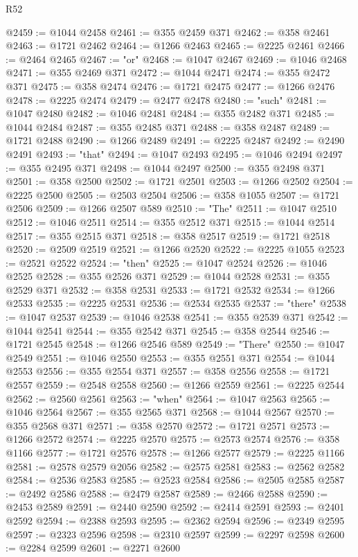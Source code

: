 \begin{lexlean}{R52}
\begin{coremodule}
@2459 := @1044 @2458
@2461 := @355 @2459 @371
@2462 := @358 @2461
@2463 := @1721 @2462
@2464 := @1266 @2463
@2465 := @2225 @2461
@2466 := @2464 @2465
@2467 := "or"
@2468 := @1047 @2467
@2469 := @1046 @2468
@2471 := @355 @2469 @371
@2472 := @1044 @2471
@2474 := @355 @2472 @371
@2475 := @358 @2474
@2476 := @1721 @2475
@2477 := @1266 @2476
@2478 := @2225 @2474
@2479 := @2477 @2478
@2480 := "such"
@2481 := @1047 @2480
@2482 := @1046 @2481
@2484 := @355 @2482 @371
@2485 := @1044 @2484
@2487 := @355 @2485 @371
@2488 := @358 @2487
@2489 := @1721 @2488
@2490 := @1266 @2489
@2491 := @2225 @2487
@2492 := @2490 @2491
@2493 := "that"
@2494 := @1047 @2493
@2495 := @1046 @2494
@2497 := @355 @2495 @371
@2498 := @1044 @2497
@2500 := @355 @2498 @371
@2501 := @358 @2500
@2502 := @1721 @2501
@2503 := @1266 @2502
@2504 := @2225 @2500
@2505 := @2503 @2504
@2506 := @358 @1055
@2507 := @1721 @2506
@2509 := @1266 @2507 @589
@2510 := "The"
@2511 := @1047 @2510
@2512 := @1046 @2511
@2514 := @355 @2512 @371
@2515 := @1044 @2514
@2517 := @355 @2515 @371
@2518 := @358 @2517
@2519 := @1721 @2518
@2520 := @2509 @2519
@2521 := @1266 @2520
@2522 := @2225 @1055
@2523 := @2521 @2522
@2524 := "then"
@2525 := @1047 @2524
@2526 := @1046 @2525
@2528 := @355 @2526 @371
@2529 := @1044 @2528
@2531 := @355 @2529 @371
@2532 := @358 @2531
@2533 := @1721 @2532
@2534 := @1266 @2533
@2535 := @2225 @2531
@2536 := @2534 @2535
@2537 := "there"
@2538 := @1047 @2537
@2539 := @1046 @2538
@2541 := @355 @2539 @371
@2542 := @1044 @2541
@2544 := @355 @2542 @371
@2545 := @358 @2544
@2546 := @1721 @2545
@2548 := @1266 @2546 @589
@2549 := "There"
@2550 := @1047 @2549
@2551 := @1046 @2550
@2553 := @355 @2551 @371
@2554 := @1044 @2553
@2556 := @355 @2554 @371
@2557 := @358 @2556
@2558 := @1721 @2557
@2559 := @2548 @2558
@2560 := @1266 @2559
@2561 := @2225 @2544
@2562 := @2560 @2561
@2563 := "when"
@2564 := @1047 @2563
@2565 := @1046 @2564
@2567 := @355 @2565 @371
@2568 := @1044 @2567
@2570 := @355 @2568 @371
@2571 := @358 @2570
@2572 := @1721 @2571
@2573 := @1266 @2572
@2574 := @2225 @2570
@2575 := @2573 @2574
@2576 := @358 @1166
@2577 := @1721 @2576
@2578 := @1266 @2577
@2579 := @2225 @1166
@2581 := @2578 @2579 @2056
@2582 := @2575 @2581
@2583 := @2562 @2582
@2584 := @2536 @2583
@2585 := @2523 @2584
@2586 := @2505 @2585
@2587 := @2492 @2586
@2588 := @2479 @2587
@2589 := @2466 @2588
@2590 := @2453 @2589
@2591 := @2440 @2590
@2592 := @2414 @2591
@2593 := @2401 @2592
@2594 := @2388 @2593
@2595 := @2362 @2594
@2596 := @2349 @2595
@2597 := @2323 @2596
@2598 := @2310 @2597
@2599 := @2297 @2598
@2600 := @2284 @2599
@2601 := @2271 @2600

\end{coremodule}
\end{lexlean}
